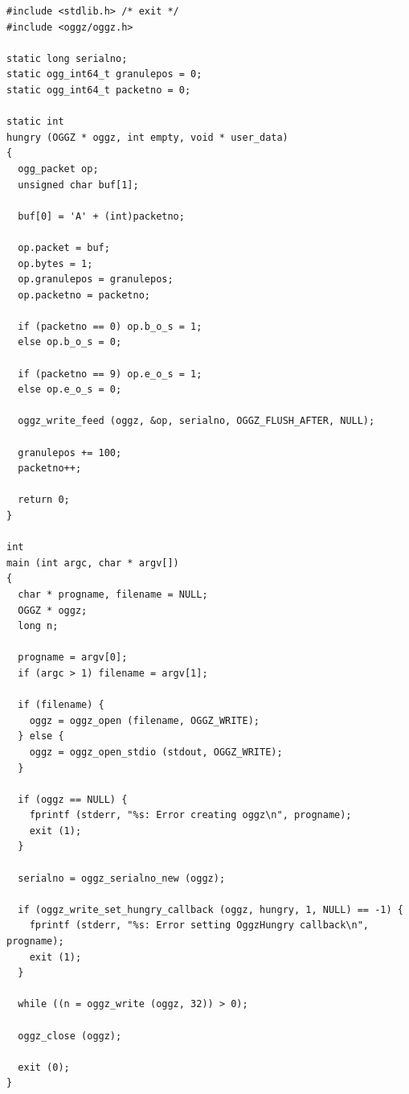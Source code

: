 \footnotesize\begin{verbatim}
#include <stdlib.h> /* exit */
#include <oggz/oggz.h>

static long serialno;
static ogg_int64_t granulepos = 0;
static ogg_int64_t packetno = 0;

static int
hungry (OGGZ * oggz, int empty, void * user_data)
{
  ogg_packet op;
  unsigned char buf[1];

  buf[0] = 'A' + (int)packetno;

  op.packet = buf;
  op.bytes = 1;
  op.granulepos = granulepos;
  op.packetno = packetno;

  if (packetno == 0) op.b_o_s = 1;
  else op.b_o_s = 0;

  if (packetno == 9) op.e_o_s = 1;
  else op.e_o_s = 0;

  oggz_write_feed (oggz, &op, serialno, OGGZ_FLUSH_AFTER, NULL);

  granulepos += 100;
  packetno++;

  return 0;
}

int
main (int argc, char * argv[])
{
  char * progname, filename = NULL;
  OGGZ * oggz;
  long n;

  progname = argv[0];
  if (argc > 1) filename = argv[1];

  if (filename) {
    oggz = oggz_open (filename, OGGZ_WRITE);
  } else {
    oggz = oggz_open_stdio (stdout, OGGZ_WRITE);
  }

  if (oggz == NULL) {
    fprintf (stderr, "%s: Error creating oggz\n", progname);
    exit (1);
  }

  serialno = oggz_serialno_new (oggz);

  if (oggz_write_set_hungry_callback (oggz, hungry, 1, NULL) == -1) {
    fprintf (stderr, "%s: Error setting OggzHungry callback\n", progname);
    exit (1);
  }

  while ((n = oggz_write (oggz, 32)) > 0);

  oggz_close (oggz);

  exit (0);
}
\end{verbatim}\normalsize
 


